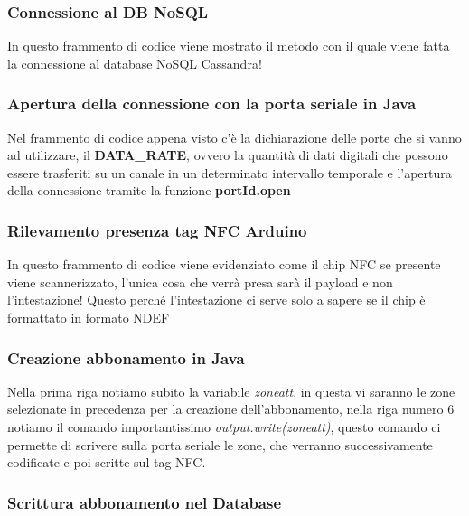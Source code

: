 \subsubsection{Connessione al DB NoSQL}


In questo frammento di codice viene mostrato il metodo con il quale viene fatta la connessione al database NoSQL Cassandra!
\subsubsection{Apertura della connessione con la porta seriale in Java}


Nel frammento di codice appena visto c'è la dichiarazione delle porte che si vanno ad utilizzare, il \textbf{DATA\_RATE}, ovvero la quantità di dati digitali che possono essere trasferiti su un canale in un determinato intervallo temporale e l'apertura della connessione tramite la funzione \textbf{portId.open}
\subsubsection{Rilevamento presenza tag NFC Arduino}


In questo frammento di codice viene evidenziato come il chip NFC se presente viene scannerizzato, l'unica cosa che verrà presa sarà il payload e non l'intestazione! Questo perché l'intestazione ci serve solo a sapere se il chip è formattato in formato NDEF
\subsubsection{Creazione abbonamento in Java}


Nella prima riga notiamo subito la variabile \textit{zoneatt}, in questa vi saranno le zone selezionate in precedenza per la creazione dell'abbonamento, nella riga numero 6 notiamo il comando importantissimo \textit{output.write(zoneatt)}, questo comando ci permette di scrivere sulla porta seriale le zone, che verranno successivamente codificate e poi scritte sul tag NFC.
\subsubsection{Scrittura abbonamento nel Database}


